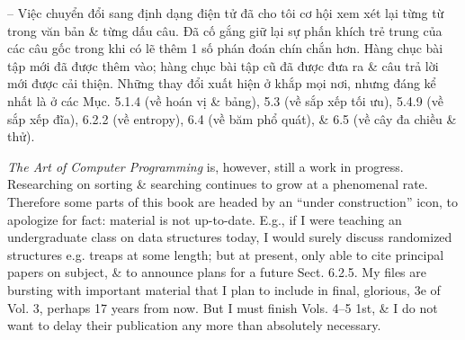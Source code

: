 \documentclass{article}
\begin{document}
\begin{itemize}
    -- Việc chuyển đổi sang định dạng điện tử đã cho tôi cơ hội xem xét lại từng từ trong văn bản \& từng dấu câu. Đã cố gắng giữ lại sự phấn khích trẻ trung của các câu gốc trong khi có lẽ thêm 1 số phán đoán chín chắn hơn. Hàng chục bài tập mới đã được thêm vào; hàng chục bài tập cũ đã được đưa ra \& câu trả lời mới được cải thiện. Những thay đổi xuất hiện ở khắp mọi nơi, nhưng đáng kể nhất là ở các Mục. 5.1.4 (về hoán vị \& bảng), 5.3 (về sắp xếp tối ưu), 5.4.9 (về sắp xếp đĩa), 6.2.2 (về entropy), 6.4 (về băm phổ quát), \& 6.5 (về cây đa chiều \& thử).
    
    {\it The Art of Computer Programming} is, however, still a work in progress. Researching on sorting \& searching continues to grow at a phenomenal rate. Therefore some parts of this book are headed by an ``under construction'' icon, to apologize for fact: material is not up-to-date. E.g., if I were teaching an undergraduate class on data structures today, I would surely discuss randomized structures e.g. treaps at some length; but at present, only able to cite principal papers on subject, \& to announce plans for a future Sect. 6.2.5. My files are bursting with important material that I plan to include in final, glorious, 3e of Vol. 3, perhaps 17 years from now. But I must finish Vols. 4--5 1st, \& I do not want to delay their publication any more than absolutely necessary.
    

\end{itemize}
\end{document}
